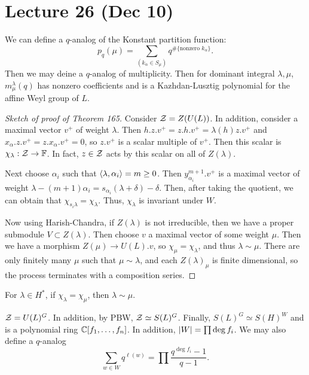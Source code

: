 \documentclass[twoside, 10pt]{article}
\newcommand{\F}{\mathbb{F}}
\begin{document}
    \section{Lecture 26 (Dec 10)}%
    
    We can define a $q$-analog of the Konstant partition function: \[ p_q(\mu)
    = \sum_{(k_{\alpha} \in S_{\mu})} q^{\# \{\text{nonzero }k_{\alpha}\}}.\]
    Then we may deine a $q$-analog of multiplicity. Then for dominant integral
    $\lambda, \mu$, $m_{\mu}^{\lambda}(q)$ has nonzero coefficients and is a
    Kazhdan-Lusztig polynomial for the affine Weyl group of $L$.

    \begin{proof}[Sketch of proof of Theorem 165] Consider $\mathcal{Z} = Z(U(L))$.
        In addition, consider a maximal vector $v^+$ of weight $\lambda$. Then
        $h.z.v^+ = z.h.v^+ = \lambda(h)z.v^+$ and $x_{\alpha}.z.v^+ =
        z.x_{\alpha}.v^+ = 0$, so $z.v^+$ is a scalar multiple of $v^+$. Then
        this scalar is $\chi_{\lambda}: \mc{Z} \to \F$. In fact, $z \in \mathcal{Z}$
        acts by this scalar on all of $Z(\lambda)$.

        Next choose $\alpha_i$ such that $\langle\lambda, \alpha_i\rangle = m \geq 0$.
        Then $y_{\alpha_i}^{m+1}.v^+$ is a maximal vector of weight $\lambda -
        (m+1) \alpha_i = s_{\alpha_i}(\lambda + \delta) - \delta$. Then, after
        taking the quotient, we can obtain that $\chi_{s_i \lambda} =
        \chi_{\lambda}$. Thus, $\chi_{\lambda}$ is invariant under $W$.

        Now using Harish-Chandra, if $Z(\lambda)$ is not irreducible, then we
    have a proper submodule $V \subset Z(\lambda)$. Then choose $v$ a maximal
vector of some weight $\mu$. Then we have a morphism $Z(\mu) \to U(L).v$, so
$\chi_{\mu} = \chi_{\lambda}$, and thus $\lambda \sim \mu$. There are only
finitely many $\mu$ such that $\mu \sim \lambda$, and each $Z(\lambda)_{\mu}$
is finite dimensional, so the process terminates with a composition series.
\end{proof}

    \begin{thm} For $\lambda \in H^*$, if $\chi_{\lambda} =
    \chi_{\mu}$, then $\lambda \sim \mu$.  \end{thm}
    
    \begin{rmk} $\mathcal{Z} = U(L)^G$. In addition, by PBW, $\mathcal{Z} \simeq S(L)^G$.
        Finally, $S(L)^G \simeq S(H)^W$ and is a polynomial ring $\mathbb{C}[f_1,
        \ldots, f_n]$. In addition, $\lvert W\rvert = \prod \deg f_i$. We may also
        define a $q$-analog \[ \sum_{w \in W} q^{\ell(w)} = \prod \frac{q^{\deg
        f_i} - 1}{q-1}.\] \end{rmk}
\end{document}
